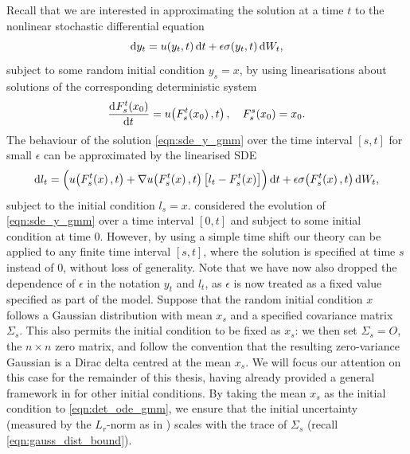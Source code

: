 Recall that we are interested in approximating the solution at a time \(t\) to the nonlinear stochastic differential equation
\begin{equation}
	\dif y_t = u\!\left(y_t, t\right)\dif t + \epsilon\sigma\!\left(y_t, t\right)\dif W_t,
	\label{eqn:sde_y_gmm}
\end{equation}
subject to some random initial condition \(y_s = x\), by using linearisations about solutions of the corresponding deterministic system
\begin{equation}
	\dod{F_s^t\!\left(x_0\right)}{t} = u\!\left(F_s^t\!\left(x_0\right), t\right), \quad F_s^s\!\left(x_0\right) = x_0.
	\label{eqn:det_ode_gmm}
\end{equation}
The behaviour of the solution \cref{eqn:sde_y_gmm} over the time interval \([s,t]\) for small \(\epsilon\) can be approximated by the linearised SDE
\begin{equation}
	\dif l_t = \left(u\!\left(F_s^t\!\left(x\right), t\right) + \nabla u\!\left(F_s^t\!\left(x\right), t\right)\left[l_t - F_s^t\!\left(x\right)\right]\right)\dif t + \epsilon\sigma\!\left(F_s^t\!\left(x\right), t\right)\dif W_t,
	\label{eqn:sde_linear_gmm}
\end{equation}
subject to the initial condition \(l_s = x\).
 considered the evolution of \cref{eqn:sde_y_gmm} over a time interval \([0,t]\) and subject to some initial condition at time \(0\).
However, by using a simple time shift our theory can be applied to any finite time interval \([s,t]\), where the solution is specified at time \(s\) instead of \(0\), without loss of generality.
Note that we have now also dropped the dependence of \(\epsilon\) in the notation \(y_t\) and \(l_t\), as \(\epsilon\) is now treated as a fixed value specified as part of the model.
Suppose that the random initial condition \(x\) follows a Gaussian distribution with mean \(x_s\) and a specified covariance matrix \(\Sigma_s\).
This also permits the initial condition to be fixed as \(x_s\): we then set \(\Sigma_s = O\), the \(n \times n\) zero matrix, and follow the convention that the resulting zero-variance Gaussian is a Dirac delta centred at the mean \(x_s\).
We will focus our attention on this case for the remainder of this thesis, having already provided a general framework in  for other initial conditions.
By taking the mean \(x_s\) as the initial condition to \cref{eqn:det_ode_gmm}, we ensure that the initial uncertainty (measured by the \(L_r\)-norm as in ) scales with the trace of \(\Sigma_s\) (recall \cref{eqn:gauss_dist_bound}).

